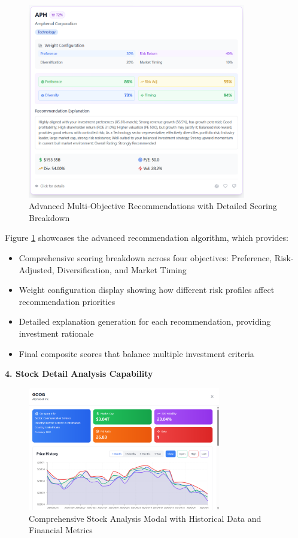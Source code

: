 \begin{figure}[h]
\centering
\includegraphics[width=0.85\textwidth]{images/stock_recommend/advanced.png}
\caption{Advanced Multi-Objective Recommendations with Detailed Scoring Breakdown}
\label{fig:advanced_recommendations}
\end{figure}

Figure \ref{fig:advanced_recommendations} showcases the advanced recommendation algorithm, which provides:
\begin{itemize}
\item Comprehensive scoring breakdown across four objectives: Preference, Risk-Adjusted, Diversification, and Market Timing
\item Weight configuration display showing how different risk profiles affect recommendation priorities
\item Detailed explanation generation for each recommendation, providing investment rationale
\item Final composite scores that balance multiple investment criteria
\end{itemize}

\textbf{4. Stock Detail Analysis Capability}

\begin{figure}[h]
\centering
\includegraphics[width=0.75\textwidth]{images/stock_recommend/detail.png}
\caption{Comprehensive Stock Analysis Modal with Historical Data and Financial Metrics}
\label{fig:stock_detail}
\end{figure}

